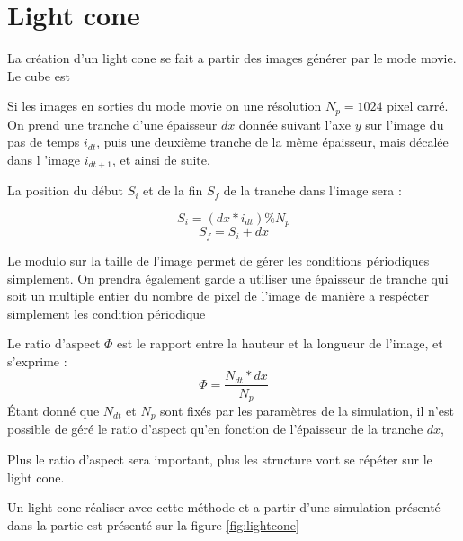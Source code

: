 \section{Light cone}
La création d'un light cone se fait a partir des images générer par le mode movie.
Le cube est 

Si les images en sorties du mode movie on une résolution $N_p=1024$ pixel carré.
On prend une tranche d'une épaisseur $dx$ donnée suivant l'axe $y$ sur l'image du pas de temps $i_{dt}$, puis une deuxième tranche de la même épaisseur, mais décalée dans l 'image $i_{dt+1}$, et ainsi de suite.

La position du début $S_i$ et de la fin $S_f$ de la tranche dans l'image sera :

\begin{equation}
S_i = (dx * i_{dt}) \% N_p 
\end{equation} 
\begin{equation}
S_f = S_i + dx 
\end{equation} 

Le modulo sur la taille de l'image permet de gérer les conditions périodiques simplement.
On prendra également garde a utiliser une épaisseur de tranche qui soit un multiple entier du nombre de pixel de l'image de manière a respécter simplement les condition périodique

Le ratio d'aspect $\Phi$ est le rapport entre la hauteur et la longueur de l'image, et s'exprime :
\begin{equation}
\Phi = \frac{ N_{dt} * dx}{N_p}
\end{equation}
Étant donné que $N_{dt}$ et $N_p$ sont fixés par les paramètres de la simulation, il n'est possible de géré le ratio d'aspect qu'en fonction de l'épaisseur de la tranche $dx$, 

Plus le ratio d'aspect sera important, plus les structure vont se répéter sur le light cone.

Un light cone réaliser avec cette méthode et a partir d'une simulation présenté dans la partie %
est présenté sur la figure \ref{fig:lightcone}


